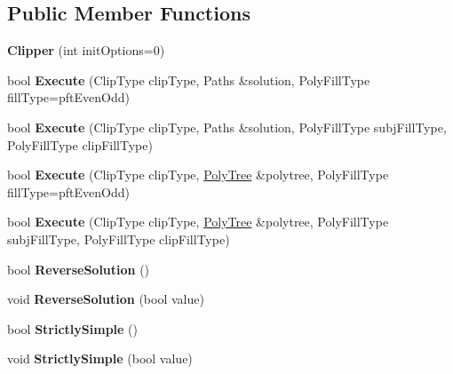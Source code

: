 \subsection*{Public Member Functions}
\begin{DoxyCompactItemize}
\item 
\mbox{\label{class_clipper_lib_1_1_clipper_adceb8536f6a80e8f115213dba9208427}} 
{\bfseries Clipper} (int init\+Options=0)
\item 
\mbox{\label{class_clipper_lib_1_1_clipper_a2e4a15e6f79a5f583b42c9701b839e01}} 
bool {\bfseries Execute} (Clip\+Type clip\+Type, Paths \&solution, Poly\+Fill\+Type fill\+Type=pft\+Even\+Odd)
\item 
\mbox{\label{class_clipper_lib_1_1_clipper_a3493f37ce691ab5a408fce12007cdcb8}} 
bool {\bfseries Execute} (Clip\+Type clip\+Type, Paths \&solution, Poly\+Fill\+Type subj\+Fill\+Type, Poly\+Fill\+Type clip\+Fill\+Type)
\item 
\mbox{\label{class_clipper_lib_1_1_clipper_aa7fc3415e002246298532b3739464d3c}} 
bool {\bfseries Execute} (Clip\+Type clip\+Type, \hyperlink{class_clipper_lib_1_1_poly_tree}{Poly\+Tree} \&polytree, Poly\+Fill\+Type fill\+Type=pft\+Even\+Odd)
\item 
\mbox{\label{class_clipper_lib_1_1_clipper_a66e1adf49ba563b0ab21ab9cd035ee2c}} 
bool {\bfseries Execute} (Clip\+Type clip\+Type, \hyperlink{class_clipper_lib_1_1_poly_tree}{Poly\+Tree} \&polytree, Poly\+Fill\+Type subj\+Fill\+Type, Poly\+Fill\+Type clip\+Fill\+Type)
\item 
\mbox{\label{class_clipper_lib_1_1_clipper_ad556ba9961f498de02d55dc95bc5a889}} 
bool {\bfseries Reverse\+Solution} ()
\item 
\mbox{\label{class_clipper_lib_1_1_clipper_a44afc0c82a1d2607829b5fd21f7644ef}} 
void {\bfseries Reverse\+Solution} (bool value)
\item 
\mbox{\label{class_clipper_lib_1_1_clipper_a50eb4c514466ed37fd365769e0bcf67b}} 
bool {\bfseries Strictly\+Simple} ()
\item 
\mbox{\label{class_clipper_lib_1_1_clipper_a85aa82d75e0d7d1f380d2e96231d6aa3}} 
void {\bfseries Strictly\+Simple} (bool value)
\end{DoxyCompactItemize}
